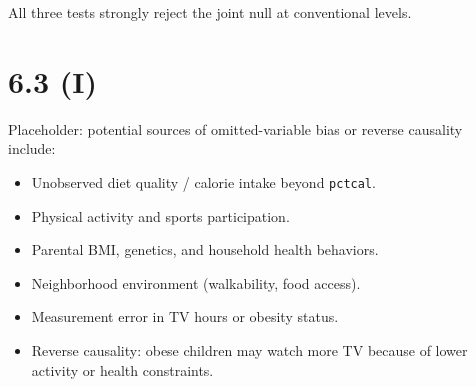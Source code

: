 \documentclass{article}
\begin{document}
\noindent All three tests strongly reject the joint null at conventional levels.


\clearpage
\section*{6.3 (I)}

\noindent Placeholder: potential sources of omitted-variable bias or reverse causality include:
\begin{itemize}
\item Unobserved diet quality / calorie intake beyond \texttt{pctcal}.
\item Physical activity and sports participation.
\item Parental BMI, genetics, and household health behaviors.
\item Neighborhood environment (walkability, food access).
\item Measurement error in TV hours or obesity status.
\item Reverse causality: obese children may watch more TV because of lower activity or health constraints.
\end{itemize}
\end{document}
